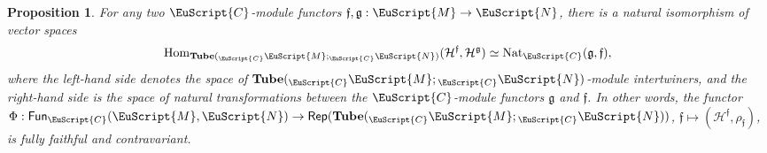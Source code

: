 \documentclass[a4paper,11pt]{article}
\newtheorem{proposition}[theorem]{Proposition}
\theoremstyle{definition}
\theoremstyle{remark}
\newcommand\eC           {\EuScript{C}}
\newcommand\eM          {\EuScript{M}}
\newcommand\eN         {\EuScript{N}}
\newcommand{\Rep}{\mathsf{Rep}}
\newcommand{\Hom}{\operatorname{Hom}}
\newcommand{\Tube}{\mathbf{Tube}}
\newcommand{\Fun}{\mathsf{Fun}}
\begin{document}
\begin{proposition} \label{prop:Hom-Nat}
    For any two $\eC$-module functors $\mathfrak{f}, \mathfrak{g}: \eM \to \eN$, there is a natural isomorphism of vector spaces
    \begin{equation}
        \Hom_{\Tube({}_\eC\eM;{}_\eC\eN)}(\mathcal{H}^\mathfrak{f},\mathcal{H}^\mathfrak{g})\simeq \operatorname{Nat}_{\eC}(\mathfrak{g},\mathfrak{f}), 
    \end{equation}
    where the left-hand side denotes the space of $\Tube({}_\eC\eM;{}_\eC\eN)$-module intertwiners, and the right-hand side is the space of natural transformations between the $\eC$-module functors $\mathfrak{g}$ and $\mathfrak{f}$. In other words, the functor $\Phi: \Fun_{\eC}(\eM,\eN) \to \Rep(\Tube({}_\eC\eM;{}_\eC\eN))$, $\mathfrak{f} \mapsto (\mathcal{H}^{\mathfrak{f}},\rho_\mathfrak{f})$, is fully faithful and contravariant.
\end{proposition}
\end{document}
